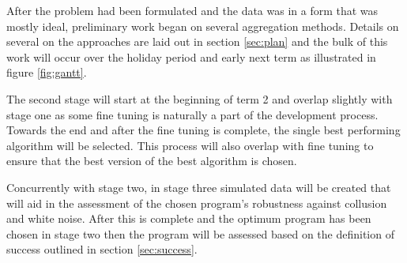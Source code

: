 After the problem had been formulated and the data was in a form that was mostly ideal, preliminary work began on several aggregation methods. Details on several on the approaches are laid out in section \ref{sec:plan} and the bulk of this work will occur over the holiday period and early next term as illustrated in figure \ref{fig:gantt}.

The second stage will start at the beginning of term 2 and overlap slightly with stage one as some fine tuning is naturally a part of the development process. Towards the end and after the fine tuning is complete, the single best performing algorithm will be selected. This process will also overlap with fine tuning to ensure that the best version of the best algorithm is chosen.

Concurrently with stage two, in stage three simulated data will be created that will aid in the assessment of the chosen program's robustness against collusion and white noise. After this is complete and the optimum program has been chosen in stage two then the program will be assessed based on the definition of success outlined in section \ref{sec:success}.

